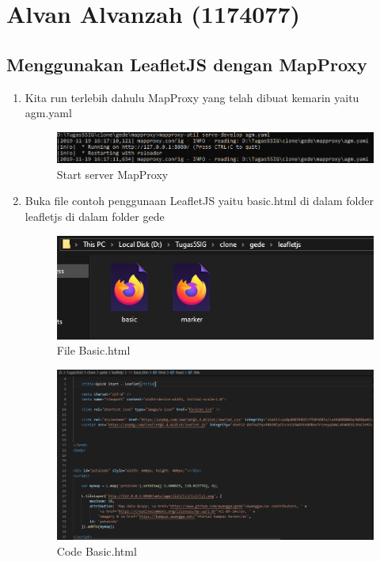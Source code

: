 \section{Alvan Alvanzah (1174077)}
\subsection{Menggunakan LeafletJS dengan MapProxy}
\begin{enumerate}
    \item Kita run terlebih dahulu MapProxy yang telah dibuat kemarin yaitu agm.yaml
    \hfill\break
    \begin{figure}[H]
		\includegraphics[width=12cm]{figures/Tugas5/1174077/1.png}
		\centering
		\caption{Start server MapProxy}
	\end{figure}
    \item Buka file contoh penggunaan LeafletJS yaitu basic.html di dalam folder leafletjs di dalam folder gede
    \hfill\break
    \begin{figure}[H]
		\includegraphics[width=12cm]{figures/Tugas5/1174077/2.png}
		\centering
		\caption{File Basic.html}
	\end{figure}
	\begin{figure}[H]
		\includegraphics[width=12cm]{figures/Tugas5/1174077/7.png}
		\centering
		\caption{Code Basic.html}

\end{figure}
\end{enumerate}
